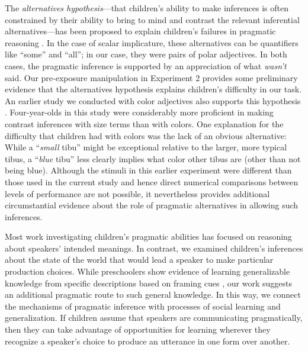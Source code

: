 \documentclass[man]{apa2}
\begin{document}
The \emph{alternatives hypothesis}---that children's ability to make inferences is often constrained by their ability to bring to mind and contrast the relevant inferential alternatives---has been proposed to explain children's failures in pragmatic reasoning \cite{chierchia2001,barner2011}. In the case of scalar implicature, these alternatives can be quantifiers like ``some'' and ``all''; in our case, they were pairs of polar adjectives. In both cases, the pragmatic inference is supported by an appreciation of what \emph{wasn't} said. Our pre-exposure manipulation in Experiment 2 provides some preliminary evidence that the alternatives hypothesis explains children's difficulty in our task. An earlier study we conducted with color adjectives also supports this hypothesis \cite{horowitz2012}. Four-year-olds in this study were considerably more proficient in making contrast inferences with size terms than with colors. One explanation for the difficulty that children had with colors was the lack of an obvious alternative: While a ``\emph{small} tibu'' might be exceptional relative to the larger, more typical tibus, a ``\emph{blue} tibu'' less clearly implies what color other tibus are (other than not being blue). Although the stimuli in this earlier experiment were different than those used in the current study and hence direct numerical comparisons between levels of performance are not possible, it nevertheless provides additional circumstantial evidence about the role of pragmatic alternatives in allowing such inferences. 

Most work investigating children's pragmatic abilities has focused on reasoning about speakers' intended meanings. In contrast, we examined children's inferences about the state of the world that would lead a speaker to make particular production choices. While preschoolers show evidence of learning generalizable knowledge from specific descriptions based on framing cues \cite{cimpian2009}, our work suggests an additional pragmatic route to such general knowledge. In this way, we connect the mechanisms of pragmatic inference with processes of social learning and generalization. If children assume that speakers are communicating pragmatically, then they can take advantage of opportunities for learning wherever they recognize a speaker's choice to produce an utterance in one form over another. 



\end{document}
